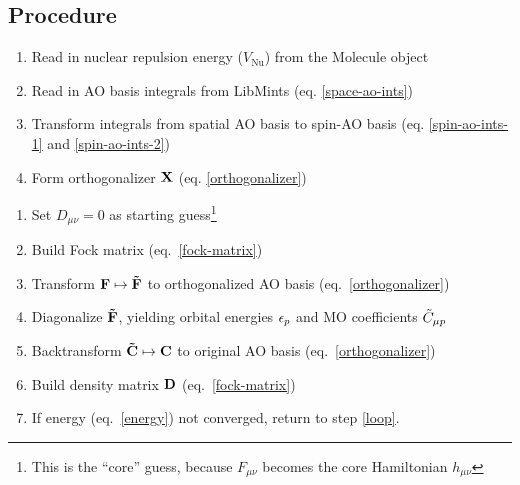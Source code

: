 \documentclass[fleqn]{article}
\begin{document}
\subsection*{Procedure}

\begin{enumerate}
  \item Read in nuclear repulsion energy ($V_\mathrm{Nu}$) from the Molecule object
  \item Read in AO basis integrals from LibMints (eq. \ref{space-ao-ints})
  \item Transform integrals from spatial AO basis to spin-AO basis (eq. \ref{spin-ao-ints-1} and \ref{spin-ao-ints-2})
  \item Form orthogonalizer $\mathbf{X}$ (eq. \ref{orthogonalizer})
\end{enumerate}

\noindent
{}
\begin{enumerate}
  \item Set $D_{\mu\nu}=0$ as starting guess\footnote{This is the ``core'' guess, because $F_{\mu\nu}$ becomes the core Hamiltonian $h_{\mu\nu}$}
  \item\label{loop} Build Fock matrix (eq.~\ref{fock-matrix})
  \item Transform $\mathbf{F}\mapsto\mathbf{\tilde{F}}$ to orthogonalized AO basis (eq.~\ref{orthogonalizer})
  \item Diagonalize $\mathbf{\tilde{F}}$, yielding orbital energies $\epsilon_p$ and MO coefficients $\tilde{C}_{\mu p}$
  \item Backtransform $\mathbf{\tilde{C}}\mapsto\mathbf{C}$ to original AO basis (eq.~\ref{orthogonalizer})
  \item Build density matrix $\mathbf{D}$ (eq.~\ref{fock-matrix})
  \item If energy (eq.~\ref{energy}) not converged, return to step \ref{loop}.
\end{enumerate}
\end{document}
